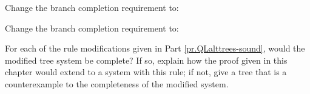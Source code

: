 \begin{earg}
\item Change the branch completion requirement to:

\item Change the branch completion requirement to:
	
	\end{earg}
	
	
	
	
\solutions
\problempart
\label{pr.QLalttrees-complete}
For each of the rule modifications given in Part \ref{pr.QLalttrees-sound}, would the modified tree system be complete? If so, explain how the proof given in this chapter would extend to a system with this rule; if not, give a tree that is a counterexample to the completeness of the modified system.

